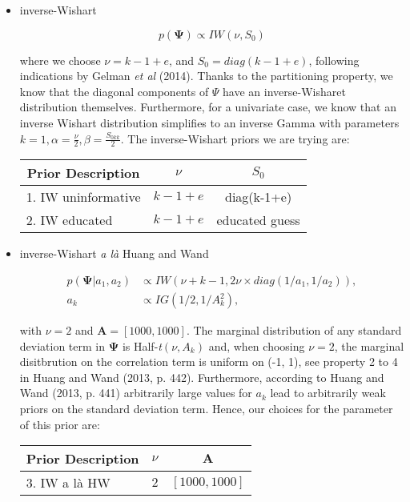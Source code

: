 \documentclass[a4paper]{article}
\begin{document}
\begin{itemize}
	\item inverse-Wishart
	
\begin{equation}
p(\bm{\Psi}) \propto IW(\nu, S_{0})
\end{equation}	

where we choose $\nu = k-1+e$, and $S_{0}=diag(k-1+e)$, following indications by Gelman \textit{et al} (2014). Thanks to the partitioning property, we know that the diagonal components of $\Psi$ have an inverse-Wisharet distribution themselves. Furthermore, for a univariate case, we know that an inverse Wishart distribution simplifies to an inverse Gamma with parameters $k=1, \alpha=\frac{\nu}{2}, \beta = \frac{S_{0kk}}{2}$. The inverse-Wishart priors we are trying are:
\begin{center}
\begin{tabular}{ c c c }
 Prior Description & $\nu$ & $S_{0}$ \\ 
 \hline
 \multicolumn{1}{l}{1. IW uninformative} & $k-1+e$ & diag(k-1+e) \\  
 \multicolumn{1}{l}{2. IW educated} & $k-1+e$ & educated guess \\
 \hline
\end{tabular}
\end{center}

	\item inverse-Wishart \textit{a là} Huang and Wand

\begin{equation}
	\begin{split}
	p(\bm{\Psi}|a_1, a_2)& \propto IW(\nu + k - 1, 2\nu \times diag(1/a_1, 1/a_2)), \\
	a_k& \propto IG(1/2,1/A_k^2),
	\end{split}
\end{equation}

with $\nu = 2$ and $\bm{A} = [1000, 1000]$. The marginal distribution of any standard deviation term in $\bm{\Psi}$ is Half-\textit{t}$(\nu, A_k)$ and, when choosing $\nu = 2$, the marginal disitbrution on the correlation term is uniform on (-1, 1), see property 2 to 4 in Huang and Wand (2013, p. 442). Furthermore, according to Huang and Wand (2013, p. 441) arbitrarily large values for $a_k$ lead to arbitrarily weak priors on the standard deviation term. Hence, our choices for the parameter of this prior are: 
	
\begin{center}
\begin{tabular}{ c c c }
 Prior Description & $\nu$ & $\bm{A}$ \\ 
 \hline
 \multicolumn{1}{l}{3. IW a là HW} & $2$ & $[1000, 1000]$ \\  
 \hline
\end{tabular}
\end{center}	
	

\end{itemize}
\end{document}
